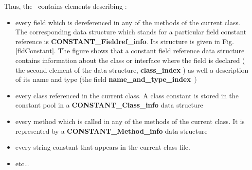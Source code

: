 Thus, the \constantPool \ contains elements describing :
\begin{itemize}
  \item every field which is dereferenced in any of the methods
of the current class. The corresponding data structure which stands for a particular field constant reference is 
 \textbf{CONSTANT\_Fieldref\_info}. Its structure is given in Fig.\ref{fldConstant}. The figure shows that
 a constant  field reference data structure contains information about the class or interface where the field is declared ( the second element of the data structure, \textbf{class\_index}  )
 as well a description of its name and type (the field \textbf{name\_and\_type\_index}~)
   \item every class referenced in the current class.  A class constant is stored in the constant pool
         in a  \textbf{CONSTANT\_Class\_info} data structure 
     \item every method which is called in any of the methods
of the current class. It is represented by a  \textbf{CONSTANT\_Method\_info} data structure
      \item every string constant that appears in the current class file.
	\item etc...
\end{itemize}

 


